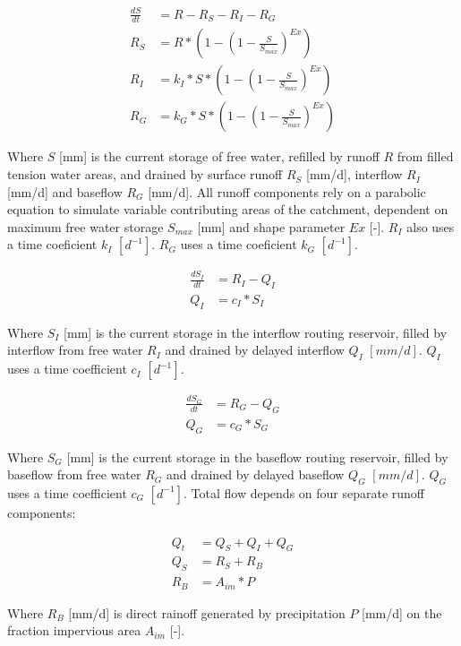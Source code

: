 \begin{align}
	\frac{dS}{dt} &= R-R_S-R_I-R_G\\
	R_S &= R*\left(1-\left(1-\frac{S}{S_{max}}\right)^{Ex}\right) \\
	R_I  &= k_I * S * \left(1-\left(1-\frac{S}{S_{max}}\right)^{Ex}\right)\\
	R_G  &= k_G * S * \left(1-\left(1-\frac{S}{S_{max}}\right)^{Ex}\right)
\end{align}

Where $S$ [mm] is the current storage of free water, refilled by runoff $R$ from filled tension water areas, and drained by surface runoff $R_S$ [mm/d], interflow $R_I$ [mm/d] and baseflow $R_G$ [mm/d].
All runoff components rely on a parabolic equation to simulate variable contributing areas of the catchment, dependent on maximum free water storage $S_{max}$ [mm] and shape parameter $Ex$ [-]. 
$R_I$ also uses a time coeficient $k_I$ $[d^{-1}]$.
$R_G$ uses a time coeficient $k_G$ $[d^{-1}]$.

\begin{align}
	\frac{dS_I}{dt} &= R_{I} - Q_I\\
	Q_I &= c_I*S_I 
\end{align}

Where $S_I$ [mm] is the current storage in the interflow routing reservoir, filled by interflow from free water $R_I$ and drained by delayed interflow $Q_I$ $[mm/d]$.
$Q_I$ uses a time coefficient $c_I$ $[d^{-1}]$.

\begin{align}
	\frac{dS_G}{dt} &= R_{G} - Q_G\\
	Q_G &= c_G*S_G
\end{align}

Where $S_G$ [mm] is the current storage in the baseflow routing reservoir, filled by baseflow from free water $R_G$ and drained by delayed baseflow $Q_G$ $[mm/d]$.
$Q_G$ uses a time coefficient $c_G$ $[d^{-1}]$.
Total flow depends on four separate runoff components:

\begin{align}
	Q_t &= Q_S + Q_I + Q_G \\
	Q_S &= R_S + R_B \\
	R_B &= A_{im}*P
\end{align}

Where $R_B$ [mm/d] is direct rainoff generated by precipitation $P$ [mm/d] on the fraction impervious area $A_{im}$ [-].

